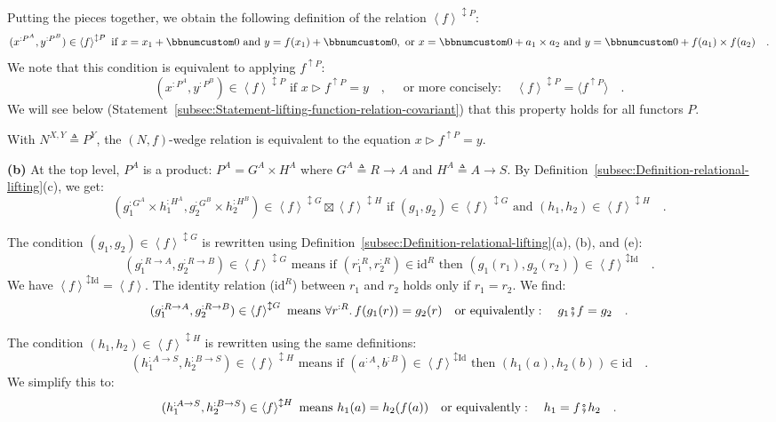 Putting the pieces together, we obtain the following definition of
the relation $\left<f\right>^{\updownarrow P}$:
\[
(x^{:P^{A}},y^{:P^{B}})\in\left<f\right>^{\updownarrow P}\text{ if }x=x_{1}+\bbnum 0\text{ and }y=f(x_{1})+\bbnum 0,\text{ or }x=\bbnum 0+a_{1}\times a_{2}\text{ and }y=\bbnum 0+f(a_{1})\times f(a_{2})\quad.
\]
We note that this condition is equivalent to applying $f^{\uparrow P}$:
\[
(x^{:P^{A}},y^{:P^{B}})\in\left<f\right>^{\updownarrow P}\text{ if }x\triangleright f^{\uparrow P}=y\quad,\quad\text{ or more concisely}:\quad\left<f\right>^{\updownarrow P}=\langle f^{\uparrow P}\rangle\quad.
\]
We will see below (Statement~\ref{subsec:Statement-lifting-function-relation-covariant})
that this property holds for all functors $P$.

With $N^{X,Y}\triangleq P^{Y}$, the $\left(N,f\right)$-wedge relation
is equivalent to the equation $x\triangleright f^{\uparrow P}=y$.

\textbf{(b)} At the top level, $P^{A}$ is a product: $P^{A}=G^{A}\times H^{A}$
where $G^{A}\triangleq R\rightarrow A$ and $H^{A}\triangleq A\rightarrow S$.
By Definition~\ref{subsec:Definition-relational-lifting}(c), we
get:
\[
(g_{1}^{:G^{A}}\times h_{1}^{:H^{A}},g_{2}^{:G^{B}}\times h_{2}^{:H^{B}})\in\left<f\right>^{\updownarrow G}\boxtimes\left<f\right>^{\updownarrow H}\text{ if }(g_{1},g_{2})\in\left<f\right>^{\updownarrow G}\text{ and }(h_{1},h_{2})\in\left<f\right>^{\updownarrow H}\quad.
\]

The condition $(g_{1},g_{2})\in\left<f\right>^{\updownarrow G}$ is
rewritten using Definition~\ref{subsec:Definition-relational-lifting}(a),
(b), and (e):
\[
(g_{1}^{:R\rightarrow A},g_{2}^{:R\rightarrow B})\in\left<f\right>^{\updownarrow G}\text{ means if }(r_{1}^{:R},r_{2}^{:R})\in\text{id}^{R}\text{ then }(g_{1}(r_{1}),g_{2}(r_{2}))\in\left<f\right>^{\updownarrow\text{Id}}\quad.
\]
We have $\left<f\right>^{\updownarrow\text{Id}}=\left<f\right>$.
The identity relation ($\text{id}^{R}$) between $r_{1}$ and $r_{2}$
holds only if $r_{1}=r_{2}$. We find:
\[
(g_{1}^{:R\rightarrow A},g_{2}^{:R\rightarrow B})\in\left<f\right>^{\updownarrow G}\text{ means }\forall r^{:R}.\,f(g_{1}(r))=g_{2}(r)\quad\text{or equivalently}:\quad g_{1}\bef f=g_{2}\quad.
\]

The condition $(h_{1},h_{2})\in\left<f\right>^{\updownarrow H}$ is
rewritten using the same definitions:
\[
(h_{1}^{:A\rightarrow S},h_{2}^{:B\rightarrow S})\in\left<f\right>^{\updownarrow H}\text{ means if }(a^{:A},b^{:B})\in\left<f\right>^{\updownarrow\text{Id}}\text{ then }(h_{1}(a),h_{2}(b))\in\text{id}\quad.
\]
We simplify this to:
\[
(h_{1}^{:A\rightarrow S},h_{2}^{:B\rightarrow S})\in\left<f\right>^{\updownarrow H}\text{ means }h_{1}(a)=h_{2}(f(a))\quad\text{or equivalently}:\quad h_{1}=f\bef h_{2}\quad.
\]

